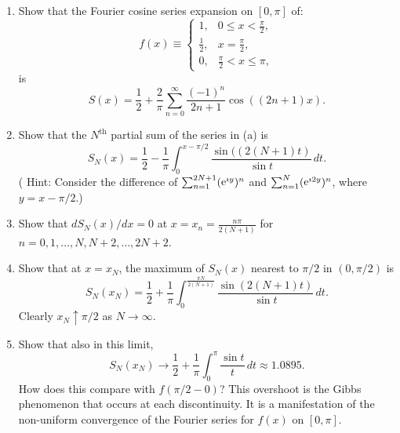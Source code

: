 {%
\begin{Exercise}
  \begin{enumerate}
  \item
    Show that the Fourier cosine series expansion on $[0,\pi]$ of:
    \[
    f(x) \equiv
    \begin{cases}
      1,      &0 \leq x < \frac{\pi}{2}, \\
      \frac{1}{2}, &x = \frac{\pi}{2}, \\
      0,      &\frac{\pi}{2} < x \leq \pi,
    \end{cases}
    \]
    is
    \[
    S(x) = \frac{1}{2} + \frac{2}{\pi} \sum_{n = 0}^\infty \frac{ (-1)^n }{ 2n+1 }
    \cos((2n+1)x).
    \]
  \item
    Show that the $N^{\mathrm{th}}$ partial sum of the series in (a) is
    \[
    S_N(x) = \frac{1}{2} - \frac{1}{\pi} \int_0^{x - \pi/2}
    \frac{ \sin((2(N+1)t) }{ \sin t } \,d t.
    \]
    ( Hint:  Consider the difference of $\sum_{n=1}^{2N+1} (\mathop{\mathrm{e}}\nolimits^{\imath y})^n$
    and $\sum_{n=1}^{N} (\mathop{\mathrm{e}}\nolimits^{\imath 2 y})^n$, where $y = x - \pi/2$.)
  \item
    Show that $d S_N(x) / d x = 0$ at $x = x_n = \frac{ n \pi }{ 2(N+1) }$
    for $n = 0, 1, \ldots, N, N+2, \ldots, 2N+2$.
  \item
    Show that at $x = x_N$, the maximum of $S_N(x)$ nearest to $\pi/2$ in
    $(0,\pi/2)$ is
    \[
    S_N(x_N) = \frac{1}{2} + \frac{1}{\pi} \int_0^{\frac{ \pi N }{ 2(N+1) }}
    \frac{ \sin(2(N+1) t) }{ \sin t } \,d t.
    \]
    Clearly $x_N \uparrow \pi / 2$ as $N \to \infty$.
  \item
    Show that also in this limit,
    \[
    S_N(x_N) \to \frac{1}{2} + \frac{1}{\pi} \int_0^\pi
    \frac{ \sin t }{ t } \,d t \approx 1.0895.
    \]
    How does this compare with $f(\pi / 2 - 0)$?  This overshoot is the 
    Gibbs phenomenon that occurs at each discontinuity.  It is a manifestation
    of the non-uniform convergence of the Fourier series for $f(x)$ on
    $[0,\pi]$.
  \end{enumerate}
\end{Exercise}






}
